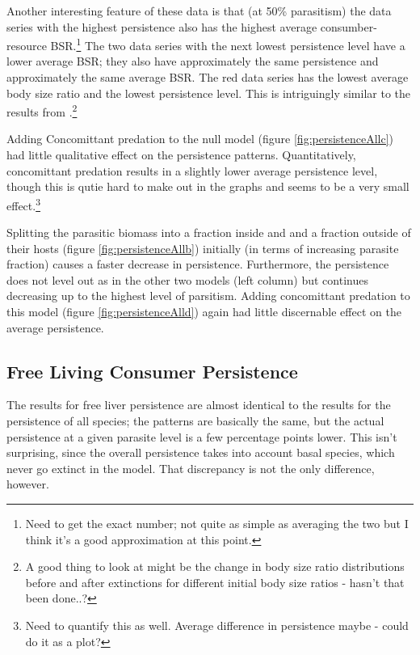 \documentclass[11pt]{amsart}
\begin{document}
Another interesting feature of these data is that (at 50\% parasitism) the data series with the highest persistence also has the highest average consumber-resource BSR.\footnote{Need to get the exact number; not quite as simple as averaging the two but I think it's a good approximation at this point.}  The two data series with the next lowest persistence level have a lower average BSR; they also have approximately the same persistence and approximately the same average BSR.  The red data series has the lowest average body size ratio and the lowest persistence level.  This is intriguingly similar to the results from \cite{Brose2006}.\footnote{A good thing to look at might be the change in body size ratio distributions before and after extinctions for different initial body size ratios - hasn't that been done..?}

Adding Concomittant predation to the null model (figure \ref{fig:persistenceAllc}) had little qualitative effect on the persistence patterns.  Quantitatively, concomittant predation results in a slightly lower average persistence level, though this is qutie hard to make out in the graphs and seems to be a very small effect.\footnote{Need to quantify this as well.  Average difference in persistence maybe - could do it as a plot?}

Splitting the parasitic biomass into a fraction inside and and a fraction outside of their hosts (figure \ref{fig:persistenceAllb}) initially (in terms of increasing parasite fraction) causes a faster decrease in persistence.  
Furthermore, the persistence does not level out as in the other two models (left column) but continues decreasing up to the highest level of parsitism.  Adding concomittant predation to this model (figure \ref{fig:persistenceAlld}) again had little discernable effect on the average persistence.

\subsection{Free Living Consumer Persistence \label{sec:persistenceFree}}

The results for free liver persistence are almost identical to the results for the persistence of all species; the patterns are basically the same, but the actual persistence at a given parasite level is a few percentage points lower.  This isn't surprising, since the overall persistence takes into account basal species, which never go extinct in the model.  That discrepancy is not the only difference, however.
\end{document}
